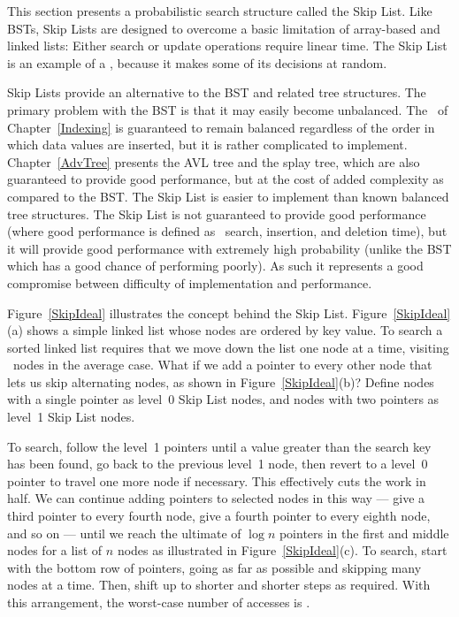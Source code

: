 This section presents a probabilistic search structure called the
Skip List.
Like BSTs, Skip Lists are designed to overcome a basic limitation of
array-based and linked lists:
Either search or update operations require linear
time.
The Skip List is an example of a
, because it makes some of its
decisions at random.

Skip Lists provide an alternative to the BST and related tree
structures.
The primary problem with the BST is that it may easily become
unbalanced.
The \TTtree\ of Chapter~\ref{Indexing}
is guaranteed to remain balanced regardless of the order in which data
values are inserted, but it is rather complicated to implement.
Chapter~\ref{AdvTree} presents the AVL tree and the
splay tree, which are also guaranteed to
provide good performance, but at the cost of added complexity as
compared to the BST.
The Skip List is easier to implement than known balanced tree
structures.
The Skip List is not guaranteed to provide good performance
(where good performance is defined as
\Thetalogn\ search, insertion, and deletion time), but it will provide
good performance with extremely high probability
(unlike the BST which has a good chance of performing poorly).
As such it represents a good compromise between difficulty of
implementation and performance.

Figure~\ref{SkipIdeal} illustrates the concept behind the Skip List.
Figure~\ref{SkipIdeal}(a) shows a simple linked list whose nodes are
ordered by key value.
To search a sorted linked list requires that we
move down the list one node at a time, visiting \Thetan\ nodes in the
average case.
What if we add a pointer to every other node that lets us
skip alternating nodes, as shown in Figure~\ref{SkipIdeal}(b)?
Define nodes with a single pointer as level~0 Skip List
nodes, and nodes with two pointers as level~1 Skip List nodes.

To search, follow the level~1 pointers until a value greater than the
search key has been found,
go back to the previous level~1 node,
then revert to a level~0 pointer to travel one more node if necessary.
This effectively cuts the work in half.
We can continue adding pointers to selected nodes in this way --- give
a third pointer to every fourth node, give a fourth pointer to every
eighth node, and so on ---  until we reach the
ultimate of $\log n$ pointers in the first and middle nodes for a list
of $n$ nodes as illustrated in Figure~\ref{SkipIdeal}(c).
To search, start with the bottom row of pointers, going as far as
possible and skipping many nodes at a time.
Then, shift up to shorter and shorter steps as required.
With this arrangement, the worst-case number of accesses is \Thetalogn.

